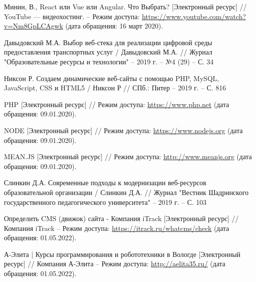 \begin{thebibliography}{00}
        Минин, В., React или Vue или Angular. Что Выбрать?
        [Электронный ресурс] //
        YouTube — видеохостинг.
        --
        Режим доступа:
        \href{https://www.youtube.com/watch?v=Nm8GpLCAgwk}{https://www.youtube.com/watch?v=Nm8GpLCAgwk}
        (дата обращения: 16 март 2020).

        Давыдовский М.А. Выбор веб-стека для реализации цифровой среды предоставления транспортных услуг
        /
        Давыдовский М.А.
        //
        Журнал "Образовательные ресурсы и технологии"
        --
        2019 г.
        --
        №4 (29)
        --
        С. 34

        Никсон Р. Создаем динамические веб-сайты с помощью PHP, MySQL, JavaScript, CSS и HTML5
        /
        Никсон Р
        //
        СПб.: Питер
        --
        2019 г.
        --
        С. 816

        PHP
        [Электронный ресурс] //
        Режим доступа:
        \href{https://www.php.net}{https://www.php.net}
        (дата обращения: 09.01.2020).

        NODE
        [Электронный ресурс] //
        Режим доступа:
        \href{https://www.nodejs.org}{https://www.nodejs.org}
        (дата обращения: 09.01.2020).


        MEAN.JS
        [Электронный ресурс] //
        Режим доступа:
        \href{http://www.meanjs.org}{http://www.meanjs.org}
        (дата обращения: 09.01.2020).

        Слинкин Д.А. Современные подходы к модернизации веб-ресурсов образовательной организации
        /
        Слинкин Д.А.
        //
        Журнал "Вестник Шадринского государственного педагогического университета"
        --
        2019 г.
        --
        С. 103

        Определить CMS (движок) сайта - Компания iTrack
        [Электронный ресурс] //
        Компания iTrack
        --
        Режим доступа:
        \href{https://itrack.ru/whatcms/check}{https://itrack.ru/whatcms/check}
        (дата обращения: 01.05.2022).

        А-Элита | Курсы программирования и робототехники в Вологде
        [Электронный ресурс] //
        Компания А-Элита
        --
        Режим доступа:
        \href{http://aelita35.ru/}{http://aelita35.ru/}
        (дата обращения: 01.05.2022).


\end{thebibliography}
